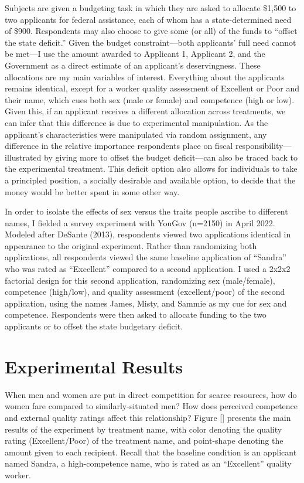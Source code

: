 \documentclass[12pt]{article}%
\begin{document}
\begin{doublespace}
Subjects are given a budgeting task in which they are asked to allocate \$1,500 to two applicants for federal assistance, each of whom has a state-determined need of \$900. Respondents may also choose to give some (or all) of the funds to ``offset the state deficit.” Given the budget constraint—both applicants’ full need cannot be met—I use the amount awarded to Applicant 1, Applicant 2, and the Government as a direct estimate of an applicant’s deservingness. These allocations are my main variables of interest. Everything about the applicants remains identical, except for a worker quality assessment of Excellent or Poor and their name, which cues both sex (male or female) and competence (high or low). Given this, if an applicant receives a different allocation across treatments, we can infer that this difference is due to experimental manipulation. As the applicant’s characteristics were manipulated via random assignment, any difference in the relative importance respondents place on fiscal responsibility—illustrated by giving more to offset the budget deficit—can also be traced back to the experimental treatment. This deficit option also allows for individuals to take a principled position, a socially desirable and available option, to decide that the money would be better spent in some other way.


In order to isolate the effects of sex versus the traits people ascribe to different names, I fielded a survey experiment with YouGov (n=2150) in April 2022. Modeled after DeSante (2013), respondents viewed two applications identical in appearance to the original experiment. Rather than randomizing both applications, all respondents viewed the same baseline application of “Sandra” who was rated as “Excellent” compared to a second application. I used a 2x2x2 factorial design for this second application, randomizing sex (male/female), competence (high/low), and quality assessment (excellent/poor) of the second application, using the names James, Misty, and Sammie as my cue for sex and competence. Respondents were then asked to allocate funding to the two applicants or to offset the state budgetary deficit.

\section*{Experimental Results}
When men and women are put in direct competition for scarce resources, how do women fare compared to similarly-situated men? How does perceived competence and external quality ratings affect this relationship? Figure [] presents the main results of the experiment by treatment name, with color denoting the quality rating (Excellent/Poor) of the treatment name, and point-shape denoting the amount given to each recipient. Recall that the baseline condition is an applicant named Sandra, a high-competence name, who is rated as an ``Excellent” quality worker.


\end{doublespace}
\end{document}
